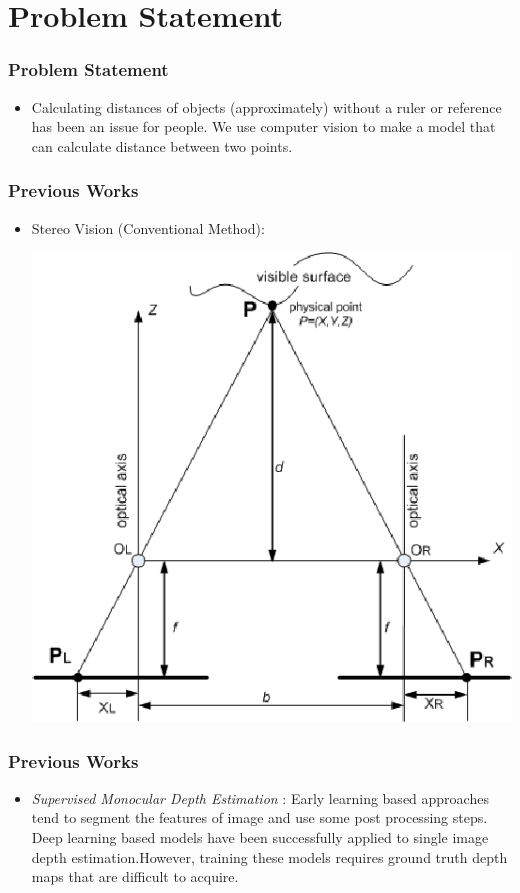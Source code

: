 \documentclass{beamer}
\begin{document}
	\section{Problem Statement}
	\begin{frame}
	\frametitle{Problem Statement}
	
	\begin{itemize}
		\item Calculating distances of objects (approximately) without a ruler or reference has been an issue for people. We use computer vision to make a model that can calculate distance between two points.
	\end{itemize}
	
	\end{frame}
	\begin{frame}
	\frametitle{Previous Works}
	\begin{itemize}
		
		\item Stereo Vision (Conventional Method): \\
		\begin{center}
			\includegraphics[height=0.5\textheight]{imgs/stereo.png}
		\end{center}
	\end{itemize}
	\end{frame}
	
	\begin{frame}
	\frametitle{Previous Works}
	\begin{itemize}
	
	\item \textit{Supervised Monocular Depth Estimation} : Early learning based approaches tend to segment the features of image and use some post processing steps. Deep learning based models have been successfully applied to single image depth estimation.However, training these models requires ground truth depth maps that are difficult to acquire.
	\end{itemize}
	\end{frame}
	
\end{document}

